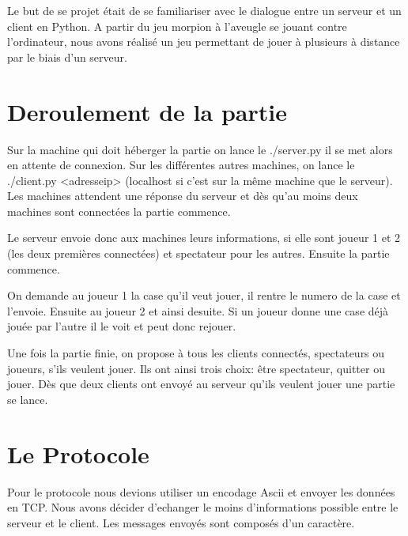 \documentclass[10pt,a4paper]{article} %
\begin{document}
    \title{\rmfamily\normalfont{}}
    \author{}
    \date{} %
    
    \maketitle
    Le but de se projet était de se familiariser avec le dialogue entre un serveur et un client en Python. A partir du jeu morpion à l'aveugle se jouant contre l'ordinateur, nous avons réalisé un jeu permettant de jouer à plusieurs à distance par le biais d'un serveur.
    
    
    
    \section{Deroulement de la partie}
    Sur la machine  qui doit héberger la partie on lance le ./server.py il se met alors en attente de connexion. Sur les différentes autres machines, on lance le ./client.py <adresseip> (localhost si c'est sur la même machine que le serveur). Les machines attendent une réponse du serveur et dès qu'au moins deux machines sont connectées la partie commence.
    
    Le serveur envoie donc aux machines leurs informations, si elle sont joueur 1 et 2 (les deux premières connectées) et spectateur pour les autres. Ensuite la partie commence.
    
    On demande au joueur 1 la case qu'il veut jouer, il rentre le numero de la case et l'envoie. Ensuite au joueur 2 et ainsi desuite. Si un joueur donne une case déjà jouée par l'autre il le voit et peut donc rejouer.
    
    Une fois la partie finie, on propose à tous les clients connectés, spectateurs ou joueurs, s'ils veulent jouer. Ils ont ainsi trois choix: être spectateur, quitter ou jouer. Dès que deux clients ont envoyé au serveur qu'ils veulent jouer une partie se lance.
    
    \section{Le Protocole}
    Pour le protocole nous devions utiliser un encodage Ascii et envoyer les données en TCP. Nous avons décider d'echanger le moins d'informations possible entre le serveur et le client. Les messages envoyés sont composés d'un caractère. 
    
\end{document}
